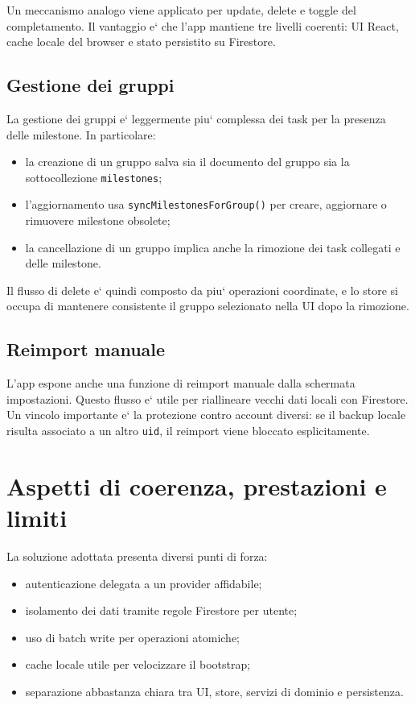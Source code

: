 \documentclass[11pt,a4paper]{article}
\begin{document}
Un meccanismo analogo viene applicato per update, delete e toggle del completamento. Il vantaggio e` che l'app mantiene tre livelli coerenti: UI React, cache locale del browser e stato persistito su Firestore.

\subsection{Gestione dei gruppi}

La gestione dei gruppi e` leggermente piu` complessa dei task per la presenza delle milestone. In particolare:

\begin{itemize}
  \item la creazione di un gruppo salva sia il documento del gruppo sia la sottocollezione \texttt{milestones};
  \item l'aggiornamento usa \texttt{syncMilestonesForGroup()} per creare, aggiornare o rimuovere milestone obsolete;
  \item la cancellazione di un gruppo implica anche la rimozione dei task collegati e delle milestone.
\end{itemize}

Il flusso di delete e` quindi composto da piu` operazioni coordinate, e lo store si occupa di mantenere consistente il gruppo selezionato nella UI dopo la rimozione.

\subsection{Reimport manuale}

L'app espone anche una funzione di reimport manuale dalla schermata impostazioni. Questo flusso e` utile per riallineare vecchi dati locali con Firestore. Un vincolo importante e` la protezione contro account diversi: se il backup locale risulta associato a un altro \texttt{uid}, il reimport viene bloccato esplicitamente.

\section{Aspetti di coerenza, prestazioni e limiti}

La soluzione adottata presenta diversi punti di forza:

\begin{itemize}
  \item autenticazione delegata a un provider affidabile;
  \item isolamento dei dati tramite regole Firestore per utente;
  \item uso di batch write per operazioni atomiche;
  \item cache locale utile per velocizzare il bootstrap;
  \item separazione abbastanza chiara tra UI, store, servizi di dominio e persistenza.
\end{itemize}
\end{document}

